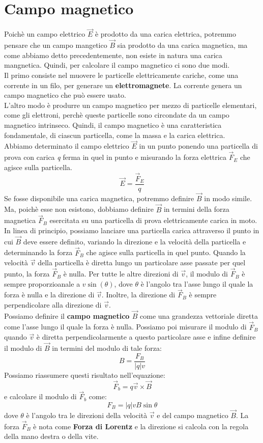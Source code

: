 \documentclass[12pt]{report}
\begin{document}
	\section{Campo magnetico}
	Poichè un campo elettrico $\vec{E}$ è prodotto da una carica elettrica, potremmo pensare che un campo mangetico $\vec{B}$ sia prodotto da una carica magnetica, ma come abbiamo detto precedentemente, non esiste in natura una carica mangnetica. Quindi, per calcolare il campo magnetico ci sono due modi. \\
	Il primo consiste nel muovere le particelle elettricamente cariche, come una corrente in un filo, per generare un \textbf{elettromagnete}. La corrente genera un campo magnetico che può essere usato. \\
	L'altro modo è produrre un campo magnetico per mezzo di particelle elementari, come gli elettroni, perchè queste particelle sono circondate da un campo magnetico intrinseco. Quindi, il campo magnetico è una caratteristica fondamentale, di ciascun particella, come la massa e la carica elettrica. \\
	Abbiamo determinato il campo elettrico $ \vec{E} $ in un punto ponendo una particella di prova con carica \textit{q} ferma in quel in punto e misurando la forza elettrica $ \vec{F}_E $ che agisce sulla particella.
	\[
	\vec{E} = \frac{\vec{F}_E}{q}
	\]
Se fosse disponibile una carica magnetica, potremmo definire $\vec{B}$ in modo simile. Ma, poichè esse non esistono, dobbiamo definire $\vec{B}$ in termini della forza magnetica $\vec{F}_B$ esercitata su una particella di prova elettricamente carica in moto. \\
In linea di principio, possiamo lanciare una particella carica attraverso il punto in cui $\vec{B}$ deve essere definito, variando la direzione e la velocità della particella e determinando la forza $\vec{F}_B$ che agisce sulla particella in quel punto. Quando la velocità $\vec{v}$ della particella è diretta lungo un particolare asse passate per quel punto, la forza $\vec{F}_B$ è nulla. Per tutte le altre direzioni di $\vec{v}$, il modulo di $\vec{F}_B$ è sempre proporzioanale a $v\sin(\theta)$, dove $\theta$ è l'angolo tra l'asse lungo il quale la forza è nulla e la direzione di $\vec{v}$. Inoltre, la direzione di $\vec{F}_B$ è sempre perpendicolare alla direzione di $\vec{v}$. \\
Possiamo definire il \textbf{campo magnetico $\vec{B}$} come una grandezza vettoriale diretta come l'asse lungo il quale la forza è nulla. Possiamo poi misurare il modulo di $\vec{F}_B$ quando $\vec{v}$ è diretta perpendicolarmente a questo particolare asse e infine definire il modulo di $\vec{B}$ in termini del modulo di tale forza:
\[
B = \frac{F_B}{|q|v}
\]
Possiamo riassumere questi risultato nell'equazione:
\[
\vec{F}_b = q\vec{v} \times \vec{B}
\]
e calcolare il modulo di $\vec{F}_b$ come:
\[
F_B = |q|vB \sin\theta
\]
dove $\theta$ è l'angolo tra le direzioni della velocità $\vec{v}$ e del campo magnetico $\vec{B}$. La forza $\vec{F}_B$ è nota come \textbf{Forza di Lorentz} e la direzione si calcola con la regola della mano destra o della vite.
\end{document}

